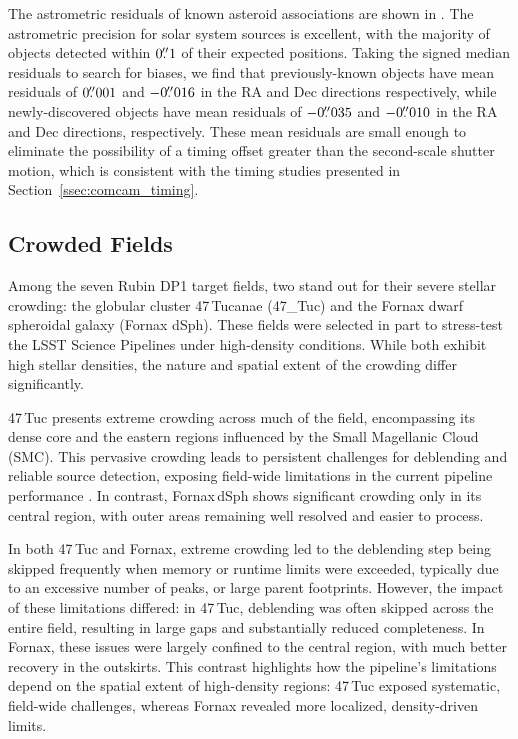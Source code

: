 The astrometric residuals of known asteroid associations are shown in .
The astrometric precision for solar system sources is excellent, with the majority of objects detected within $0\mbox{$.\!\!^{\prime\prime}$}1$ of their expected positions.
Taking the signed median residuals to search for biases, we find that previously-known objects have mean residuals of $0\mbox{$.\!\!^{\prime\prime}$}001$ and $-0\mbox{$.\!\!^{\prime\prime}$}016$ in the RA and Dec directions respectively, while newly-discovered objects have mean residuals of $-0\mbox{$.\!\!^{\prime\prime}$}035$ and $-0\mbox{$.\!\!^{\prime\prime}$}010$ in the RA and Dec directions, respectively.
These mean residuals are small enough to eliminate the possibility of a timing offset greater than the second-scale shutter motion, which is consistent with the timing studies presented in Section~\ref{ssec:comcam_timing}.

\subsection{Crowded Fields}
Among the seven Rubin DP1 target fields, two stand out for their severe stellar crowding: the globular cluster 47\,Tucanae (47\_Tuc) and the Fornax dwarf spheroidal galaxy (Fornax dSph).
These fields were selected in part to stress-test the LSST Science Pipelines under high-density conditions. 
While both exhibit high stellar densities, the nature and spatial extent of the crowding differ significantly.

47\,Tuc presents extreme crowding across much of the field, encompassing its dense core and the eastern regions influenced by the Small Magellanic Cloud (SMC). 
This pervasive crowding leads to persistent challenges for deblending and reliable source detection, exposing field-wide limitations in the current pipeline performance \citep{2025arXiv250701343C}.
In contrast, Fornax\,dSph shows significant crowding only in its central region, with outer areas remaining well resolved and easier to process. 

In both 47\,Tuc and Fornax, extreme crowding led to the deblending step being skipped frequently when memory or runtime limits were exceeded, typically due to an excessive number of peaks, or large parent footprints.
However, the impact of these limitations differed: in 47\,Tuc, deblending was often skipped across the entire field, resulting in large gaps and substantially reduced completeness. 
In Fornax, these issues were largely confined to the central region, with much better recovery in the outskirts. 
This contrast highlights how the pipeline’s limitations depend on the spatial extent of high-density regions: 47\,Tuc exposed systematic, field-wide challenges, whereas Fornax revealed more localized, density-driven limits.

